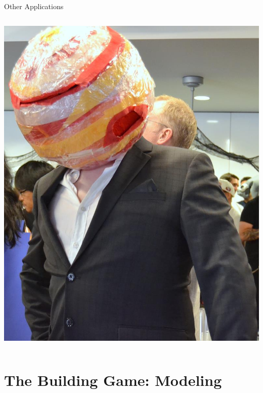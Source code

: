 \documentclass{beamer}
\begin{document}
\begin{frame}{Other Applications}
\begin{columns}
\begin{column}{0.48\textwidth}
{        \includegraphics{mr_jupiter.jpg}
}
    \end{column}
\end{columns}
\end{frame}
\section{The Building Game: Modeling}
\end{document}
